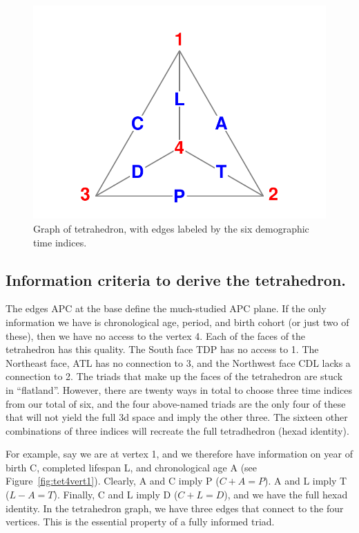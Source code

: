 \documentclass[11pt,oneside,a4paper]{article} %
\newcommand\vt[1]{\textcolor{rd}{#1}}
\newcommand\eg[1]{\textcolor{bl}{#1}}
\begin{document}
\begin{figure}[h!]
\centering
\caption{Graph of tetrahedron, with edges labeled by the six demographic time
indices.}
\label{fig:tet}
\includegraphics[scale=1]{Figures/TetraHedronVerticesEdges.pdf}
\end{figure}

\subsection*{Information criteria to derive the tetrahedron.}
The edges APC at the base define the much-studied APC plane. If the only
information we have is chronological age, period, and birth cohort (or just two
of these), then we have no access to the vertex \vt{4}. Each of the faces of the
tetrahedron has this quality. The South face \eg{TDP} has no access to \vt{1}.
The Northeast face, ATL has no connection to \vt{3}, and the Northwest face
CDL lacks a connection to \vt{2}. The triads that make up the faces of
the tetrahedron are stuck in ``flatland''. However, there are twenty ways in
total to choose three time indices from our total of six, and the four
above-named triads are the only four of these that will not yield the full 3d
space and imply the other three. The sixteen other combinations of three indices will recreate the full tetradhedron (hexad identity).

For example, say we are at vertex \vt{1}, and we therefore have
information on year of birth C, completed lifespan L, and
chronological age A (see Figure~\ref{fig:tet4vert1}). Clearly, A and
C imply P ($C+A=P$).
A and L imply T ($L-A=T$). Finally, C and
L imply D ($C+L=D$), and we have the full hexad
identity. In the tetrahedron graph, we have three edges that connect to the
four vertices. This is the essential property of a fully informed triad.
\end{document}
